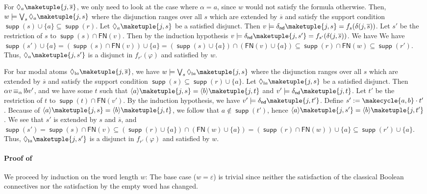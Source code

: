 \documentclass[10pt,a4paper]{amsart}
\theoremstyle{definition}
\newcommand{\seq}{\subseteq}
\newcommand{\ol}{\overline}
\newcommand{\op}[1]{\operatorname{\mathsf{#1}}}
\newcommand{\nd}{\op{nd}}
\DeclareMathOperator{\supp}{\mathsf{supp}}
\newcommand{\braket}[1]{\langle #1 \rangle}
\newcommand{\set}[1]{\{#1\}}
\DeclareMathOperator{\alphaequiv}{\equiv_{\alpha}}
\newcommand{\FN}{\mathsf{FN}}
\renewcommand{\vDash}{\models}
\newcommand{\midmid}{\hspace{0.2ex}{\rule[-0.1ex]{0.6pt}{1.65ex}}\hspace{0.2ex}}
\newcommand{\scriptmidmid}{\hspace{0.2ex}{\rule[-0.1ex]{0.6pt}{1.1ex}}\hspace{0.2ex}}
\newcommand{\newletter}[1]{{\midmid}#1}
\newcommand{\scriptnew}[1]{{\scriptmidmid}#1}
\begin{document}
  For $\Diamond_a \maketuple{j, \overline{s}}$,
  we only need to look at the case where $\alpha = a$, since $w$ would not satisfy the formula otherwise. 
  Then, $w \vDash \bigvee_s \Diamond_a \maketuple{j, s}$ where the disjunction ranges over all $s$ which are extended
  by $\overline{s}$ and satisfy the support condition $\supp(s) \cup \set{a} \seq \supp(r)$.
  Let $\Diamond_a \maketuple{j, s}$ be a satisfied disjunct. Then $v \vDash \delta_{\nd}\maketuple{j, s}=f_{s}(\delta(j,\ol{s}))$.
  Let $s'$ be the restriction of $s$ to $\supp(s) \cap \FN(v)$. Then by the induction hypothesis $v \vDash \delta_{\nd}\maketuple{j, s'}=f_{s'}(\delta(j,\ol{s}))$. We have
  We have $\supp(s') \cup \set{a} = (\supp(s)\cap \FN(v))\cup  \set{a} = (\supp(s)\cup \set{a})\cap (\FN(v)\cup \{a\})\seq \supp(r)\cap \FN(w)\seq \supp(r')$. Thus, $\Diamond_a \maketuple{j, s'}$ is a disjunct in $f_{r'}(\varphi)$ and satisfied by $w$.
  
  For bar modal atoms $\Diamond_{\scriptnew{a}} \maketuple{j, \overline{s}}$, we have $w \vDash \bigvee_s
  \Diamond_{\scriptnew{a}} \maketuple{j, s}$ where the disjunction ranges over all $s$ which are extended by $\overline{s}$
  and satisfy the support condition $\supp(s) \seq \supp(r) \cup \set{a}$. Let $\Diamond_{\scriptnew{a}} \maketuple{j, s}$
  be a satisfied disjunct.
  Then $\alpha v \alphaequiv \newletter{b} v'$, and we have some $t$ such that $\braket{a}\maketuple{j, s} =
  \braket{b}\maketuple{j, t}$ and $v' \vDash \delta_{\nd}\maketuple{j, t}$.
  Let $t'$ be the restriction of $t$ to $\supp(t) \cap \FN(v')$.
  By the induction hypothesis, we have $v' \vDash \delta_{\nd}\maketuple{j, t'}$.
  Define $s' := \makecycle{a,b} \cdot t'$. Because of $\braket{a}\maketuple{j, s} = \braket{b}\maketuple{j, t}$,
  we follow that $a \notin \supp(t')$, hence $\braket{a}\maketuple{j, s'} = \braket{b}\maketuple{j, t'}$.
  We see that $s'$ is extended by $s$ and $\overline{s}$, and $\supp(s') = \supp(s) \cap \FN(v)
 \seq (\supp(r)\cup \set{a})\cap (\FN(w)\cup \set{a}) = (\supp(r)\cap \FN(w))\cup \set{a} \seq \supp(r') \cup \set{a}$. Thus, $\Diamond_{\scriptnew{a}} \maketuple{j, s'}$ is a
  disjunct in $f_{r'}(\varphi)$ and satisfied by $w$.

\paragraph*{Proof of~}

  We proceed by induction on the word length $w$: The base case ($w = \varepsilon$) is trivial
  since neither the satisfaction of the classical Boolean connectives nor the satisfaction by the
  empty word has changed.
\end{document}
